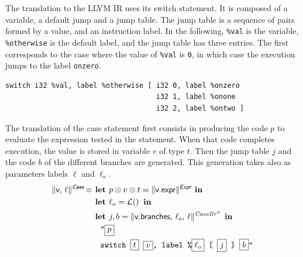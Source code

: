 \documentclass{llncs}
\newcommand{\trad}[2]{\ensuremath{\lVert \textsf{#1} \rVert^{\textit{#2}}}}
\DeclareMathOperator{\isdef}{\equiv}
\DeclareMathOperator{\lbl}{\mathcal{L}()}
\newcommand{\llvm}[1]{\texttt{#1}}
\newcommand{\B}[1]{\textsf{#1}}
\newcommand{\ListOf}[1]{$\mbox{#1}^+$}
\newcommand{\LET}[0]{\textbf{ let }}
\newcommand{\IN}[0]{\textbf{ in }}
\newcommand{\PH}[1]{\framebox{$#1$}}
\newcommand{\sep}[0]{\otimes}
\begin{document}
\begin{enumerate}
The translation to the LLVM IR uses its switch statement. It is composed of a
variable, a default jump and a jump table. The jump table is a sequence of pairs
formed by a value, and an instruction label. In the following, \llvm{\%val} is
the variable, \llvm{\%otherwise} is the default label, and the jump table has
three entries. The first corresponds to the case where the value of \llvm{\%val}
is \llvm{0}, in which case the execution jumps to the label \llvm{onzero}.
\begin{verbatim}
switch i32 %val, label %otherwise [ i32 0, label %onzero
                                    i32 1, label %onone
                                    i32 2, label %ontwo ]
\end{verbatim}

The translation of the case statement first consists in producing the code $p$
to evaluate the expression tested in the statement. When that code completes
execution, the value is stored in variable $v$ of type $t$. Then the jump table
$j$ and the code $b$ of the different branches are generated. This generation
takes also as parameters labels $\ell$ and $\ell_o$.
\begin{align*}
  \trad{v, $\ell$}{\B{Case}} \isdef & \LET p \sep v \sep t = \trad{v.expr}{\B{Expr}} \IN \\
  & \LET \ell_o = \lbl \IN \\
  & \LET j, b = \trad{v.branches, $\ell_o$, $\ell$}{\ListOf{CaseBr}} \IN \\
  & \quad \llvm{"\PH{p}} \\
  & \quad \llvm{switch \PH{t} \PH{v}, label \%\PH{\ell_o} [ \PH{j} ] \PH{b}"}
\end{align*}


\end{enumerate}
\end{document}

